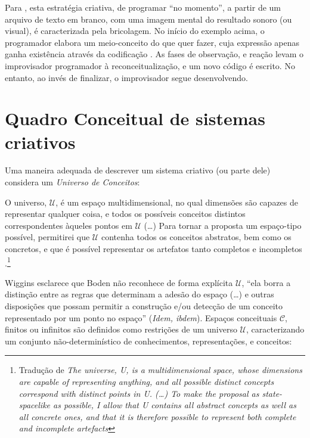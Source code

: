 Para , esta estratégia criativa, de programar ``no momento'', a partir de um arquivo de texto em branco, com uma imagem mental do resultado sonoro (ou visual), é caracterizada pela  bricolagem. No início do exemplo acima, o programador elabora um meio-conceito do que quer fazer, cuja expressão apenas ganha existência através da codificação . As fases de observação, e reação levam o improvisador programador à reconceitualização, e um novo código é escrito. No entanto, ao invés de finalizar, o improvisador segue desenvolvendo.

\section{Quadro Conceitual de sistemas criativos}\label{sec:csf}

Uma maneira adequada de descrever um sistema criativo (ou parte dele) considera um \emph{Universo de Conceitos}:

\begin{citacao}
O universo, $\mathcal{U}$, é um espaço multidimensional, no qual dimensões são capazes de representar qualquer coisa, e todos os possíveis conceitos distintos correspondentes àqueles pontos em $\mathcal{U}$ (\ldots) Para tornar a proposta um espaço-tipo possível, permitirei que $\mathcal{U}$ contenha todos os conceitos abstratos, bem como os concretos, e que é possível representar os artefatos tanto completos e incompletos \cite[p.~451]{wiggins_framework_2006}.\footnote{Tradução de \emph{The universe, U, is a multidimensional space, whose dimensions are capable of representing anything, and all possible distinct concepts correspond with distinct points in U. (\ldots) To make the proposal as state-spacelike as possible, I allow that U contains all abstract concepts as well as all concrete ones, and that it is therefore possible to represent both complete and incomplete artefacts}}
\end{citacao}

Wiggins esclarece que Boden não reconhece de forma explícita $\mathcal{U}$, ``ela borra a distinção entre as regras que determinam a adesão do espaço (\ldots) e outras disposições que possam permitir a construção e/ou detecção de um conceito representado por um ponto no espaço'' (\emph{Idem, ibdem}). Espaços conceituais $\mathcal{C}$, finitos ou infinitos são definidos como restrições de um universo $\mathcal{U}$, caracterizando um conjunto não-determinístico de conhecimentos, representações, e conceitos:

